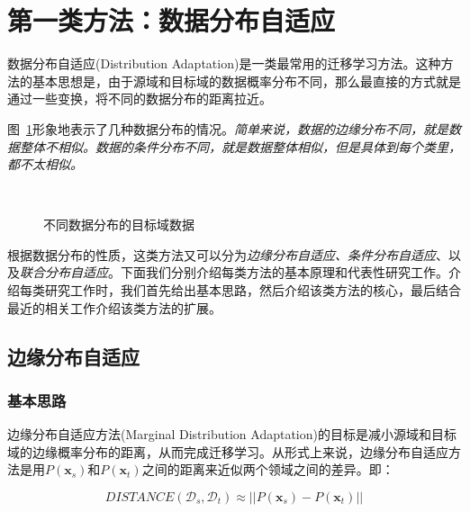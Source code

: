 \newpage
\section{第一类方法：数据分布自适应}

数据分布自适应(Distribution Adaptation)是一类最常用的迁移学习方法。这种方法的基本思想是，由于源域和目标域的数据概率分布不同，那么最直接的方式就是通过一些变换，将不同的数据分布的距离拉近。

图~\ref{fig-distribution}形象地表示了几种数据分布的情况。\textit{简单来说，数据的边缘分布不同，就是数据整体不相似。数据的条件分布不同，就是数据整体相似，但是具体到每个类里，都不太相似。}

\begin{figure}[htbp]
	\centering
	~\vline
	~
	~
	\caption{不同数据分布的目标域数据}
	\label{fig-distribution}
\end{figure}

根据数据分布的性质，这类方法又可以分为\textit{边缘分布自适应、条件分布自适应}、以及\textit{联合分布自适应}。下面我们分别介绍每类方法的基本原理和代表性研究工作。介绍每类研究工作时，我们首先给出基本思路，然后介绍该类方法的核心，最后结合最近的相关工作介绍该类方法的扩展。

\subsection{边缘分布自适应}

\subsubsection{基本思路}

边缘分布自适应方法(Marginal Distribution Adaptation)的目标是减小源域和目标域的边缘概率分布的距离，从而完成迁移学习。从形式上来说，边缘分布自适应方法是用$P(\mathbf{x}_s)$和$P(\mathbf{x}_t)$之间的距离来近似两个领域之间的差异。即：

\begin{equation}
	\label{eq-marginal-general}
	DISTANCE(\mathcal{D}_s,\mathcal{D}_t) \approx ||P(\mathbf{x}_s) - P(\mathbf{x}_t)||
\end{equation}

